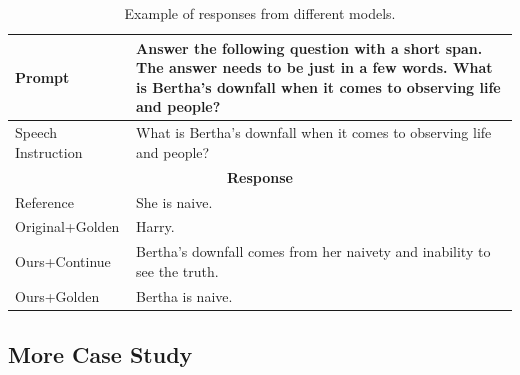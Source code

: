 \documentclass[11pt]{article}
\begin{document}
\begin{table}[htb]
{\begin{tabular}{p{3cm}p{15cm}}
				\midrule
				Prompt  & Answer the following question with a short span. The answer needs to be just in a few words. What is Bertha's downfall when it comes to observing life and people?   \\ 
				\midrule
				Speech Instruction  &What is Bertha's downfall when it comes to observing life and people? \\
				\midrule
				\multicolumn{2}{c}{\textbf{Response}} \\
				\midrule
				Reference       &She is naive.                                  \\ \midrule
				Original+Golden        & Harry.                                     \\ \midrule
				Ours+Continue        & Bertha's downfall comes from her naivety and inability to see the truth.                                     \\  \midrule
				Ours+Golden       & Bertha is naive.                                    \\   
				\bottomrule[1.5pt]
				
			\end{tabular}
			
		}
		\caption{Example of responses from different models.}
		\label{table:generate_case}
	\end{table}
	
	\subsection{More Case Study}\label{appendix:case_study}
\end{document}
